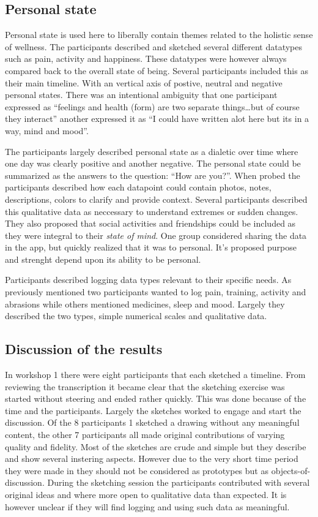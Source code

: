 \documentclass[UKenglish]{uiophd}
\begin{document}
		\subsection{Personal state}
		Personal state is used here to liberally contain themes related to the holistic sense of wellness. The participants described and sketched several different datatypes such as pain, activity and happiness. These datatypes were however always compared back to the overall state of being. Several participants included this as their main timeline. With an vertical axis of postive, neutral and negative personal states. There was an intentional ambiguity that one participant expressed as ``feelings and health (form) are two separate things\dots but of course they interact'' another expressed it as ``I could have written alot here but its in a way, mind and mood''. 

		The participants largely described personal state as a dialetic over time where one day was clearly positive and another negative. The personal state could be summarized as the answers to the question: ``How are you?''. When probed the participants described how each datapoint could contain photos, notes, descriptions, colors to clarify and provide context. Several participants described this qualitative data as neccessary to understand extremes or sudden changes. They also proposed that social activities and friendships could be included as they were integral to their \textit{state of mind}. One group considered sharing the data in the app, but quickly realized that it was to personal. It's proposed purpose and strenght depend upon its ability to be personal. 

		Participants described logging data types relevant to their specific needs. As previously mentioned two participants wanted to log pain, training, activity and abrasions while others mentioned medicines, sleep and mood. Largely they described the two types, simple numerical scales and qualitative data. 

	\subsection{Discussion of the results}
		In workshop 1 there were eight participants that each sketched a timeline. From reviewing the transcription it became clear that the sketching exercise was started without steering and ended rather quickly. This was done because of the time and the participants. Largely the sketches worked to engage and start the discussion. Of the 8 participants 1 sketched a drawing without any meaningful content, the other 7 participants all made original contributions of varying quality and fidelity. Most of the sketches are crude and simple but they describe and show several instering aspects. However due to the very short time period they were made in they should not be considered as prototypes but as objects-of-discussion. 
		During the sketching session the participants contributed with several original ideas and where more open to qualitative data than expected. It is however unclear if they will find logging and using such data as meaningful.
\end{document}
